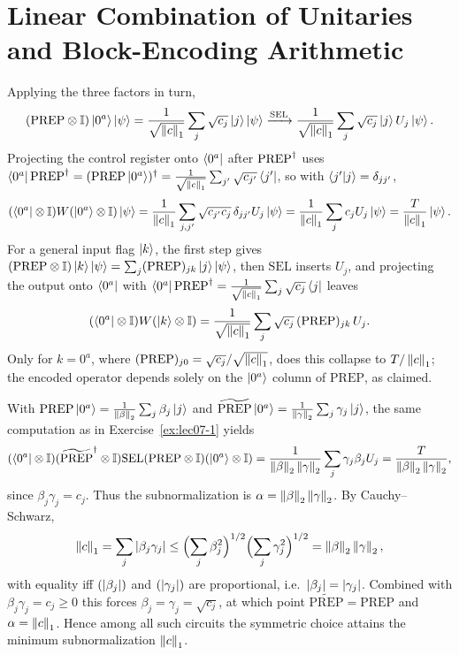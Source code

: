 \chapter{Linear Combination of Unitaries and Block-Encoding Arithmetic}

\begin{solution}
Applying the three factors in turn,
\[
  (\mathrm{PREP}\otimes\mathbb{I})\ket{0^a}\ket\psi
  =\frac{1}{\sqrt{\left\lVert c \right\rVert_1}}\sum_j\sqrt{c_j}\ket{j}\ket\psi
  \xrightarrow{\mathrm{SEL}}
  \frac{1}{\sqrt{\left\lVert c \right\rVert_1}}\sum_j\sqrt{c_j}\ket{j}U_j\ket\psi.
\]
Projecting the control register onto $\bra{0^a}$ after $\mathrm{PREP}^{\dagger}$ uses
$\bra{0^a}\mathrm{PREP}^{\dagger}=(\mathrm{PREP}\ket{0^a})^{\dagger}
=\frac{1}{\sqrt{\left\lVert c \right\rVert_1}}\sum_{j'}\sqrt{c_{j'}}\bra{j'}$, so with
$\braket{j'|j}=\delta_{jj'}$,
\[
  (\bra{0^a}\otimes\mathbb{I})W(\ket{0^a}\otimes\mathbb{I})\ket\psi
  =\frac{1}{\left\lVert c \right\rVert_1}\sum_{j,j'}\sqrt{c_{j'}c_j}\,\delta_{jj'}U_j\ket\psi
  =\frac{1}{\left\lVert c \right\rVert_1}\sum_j c_j U_j\ket\psi=\frac{T}{\left\lVert c \right\rVert_1}\ket\psi.
\]
For a general input flag $\ket{k}$, the first step gives
$(\mathrm{PREP}\otimes\mathbb{I})\ket{k}\ket\psi=\sum_j (\mathrm{PREP})_{jk}\ket{j}\ket\psi$,
then $\mathrm{SEL}$ inserts $U_j$, and projecting the output onto $\bra{0^a}$ with
$\bra{0^a}\mathrm{PREP}^{\dagger}=\frac{1}{\sqrt{\left\lVert c \right\rVert_1}}\sum_j\sqrt{c_j}\bra{j}$ leaves
\[
  (\bra{0^a}\otimes\mathbb{I})W(\ket{k}\otimes\mathbb{I})
  =\frac{1}{\sqrt{\left\lVert c \right\rVert_1}}\sum_j\sqrt{c_j}\,(\mathrm{PREP})_{jk}\,U_j.
\]
Only for $k=0^a$, where $(\mathrm{PREP})_{j0}=\sqrt{c_j}/\sqrt{\left\lVert c \right\rVert_1}$, does this
collapse to $T/\left\lVert c \right\rVert_1$; the encoded operator depends solely on the $\ket{0^a}$
column of $\mathrm{PREP}$, as claimed.
\end{solution}

\begin{solution}
With $\mathrm{PREP}\ket{0^a}=\frac{1}{\left\lVert \beta \right\rVert_2}\sum_j\beta_j\ket{j}$ and
$\widetilde{\mathrm{PREP}}\ket{0^a}=\frac{1}{\left\lVert \gamma \right\rVert_2}\sum_j\gamma_j\ket{j}$,
the same computation as in Exercise~\ref{ex:lec07-1} yields
\[
  (\bra{0^a}\otimes\mathbb{I})(\widetilde{\mathrm{PREP}}^{\dagger}\otimes\mathbb{I})\mathrm{SEL}
  (\mathrm{PREP}\otimes\mathbb{I})(\ket{0^a}\otimes\mathbb{I})
  =\frac{1}{\left\lVert \beta \right\rVert_2\left\lVert \gamma \right\rVert_2}\sum_j\gamma_j\beta_j U_j
  =\frac{T}{\left\lVert \beta \right\rVert_2\left\lVert \gamma \right\rVert_2},
\]
since $\beta_j\gamma_j=c_j$. Thus the subnormalization is
$\alpha=\left\lVert \beta \right\rVert_2\left\lVert \gamma \right\rVert_2$. By Cauchy--Schwarz,
\[
  \left\lVert c \right\rVert_1=\sum_j\left\lvert \beta_j\gamma_j \right\rvert
  \le\Bigl(\sum_j\beta_j^2\Bigr)^{1/2}\Bigl(\sum_j\gamma_j^2\Bigr)^{1/2}
  =\left\lVert \beta \right\rVert_2\left\lVert \gamma \right\rVert_2,
\]
with equality iff $(\left\lvert \beta_j \right\rvert)$ and $(\left\lvert \gamma_j \right\rvert)$ are proportional, i.e.\
$\left\lvert \beta_j \right\rvert=\left\lvert \gamma_j \right\rvert$. Combined with $\beta_j\gamma_j=c_j\ge0$ this forces
$\beta_j=\gamma_j=\sqrt{c_j}$, at which point $\widetilde{\mathrm{PREP}}=
\mathrm{PREP}$ and $\alpha=\left\lVert c \right\rVert_1$. Hence among all such circuits the symmetric
choice attains the minimum subnormalization $\left\lVert c \right\rVert_1$.
\end{solution}

